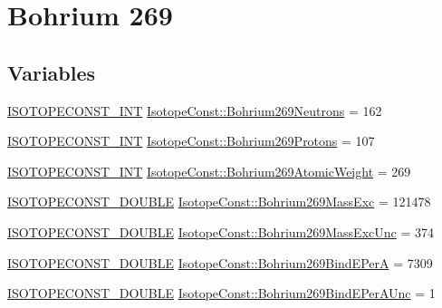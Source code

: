 \hypertarget{group___isotope_const-_bohrium-_bh269}{}\section{Bohrium 269}
\label{group___isotope_const-_bohrium-_bh269}
\subsection*{Variables}
\begin{DoxyCompactItemize}
\item 
\mbox{\hyperlink{group___isotope_const-_macros_ga5f18360b3e99483a35c32d789e62621c}{I\+S\+O\+T\+O\+P\+E\+C\+O\+N\+S\+T\+\_\+\+I\+NT}} \mbox{\hyperlink{group___isotope_const-_bohrium-_bh269_ga666e989583d4fa709b67b014e99767fc}{Isotope\+Const\+::\+Bohrium269\+Neutrons}} = 162
\item 
\mbox{\hyperlink{group___isotope_const-_macros_ga5f18360b3e99483a35c32d789e62621c}{I\+S\+O\+T\+O\+P\+E\+C\+O\+N\+S\+T\+\_\+\+I\+NT}} \mbox{\hyperlink{group___isotope_const-_bohrium-_bh269_ga0a7a2a96b3a26e07556b8cd0b2fb0b21}{Isotope\+Const\+::\+Bohrium269\+Protons}} = 107
\item 
\mbox{\hyperlink{group___isotope_const-_macros_ga5f18360b3e99483a35c32d789e62621c}{I\+S\+O\+T\+O\+P\+E\+C\+O\+N\+S\+T\+\_\+\+I\+NT}} \mbox{\hyperlink{group___isotope_const-_bohrium-_bh269_ga1162d67307e69774a4e907ad2013d976}{Isotope\+Const\+::\+Bohrium269\+Atomic\+Weight}} = 269
\item 
\mbox{\hyperlink{group___isotope_const-_macros_ga8f45a7272ce02c0b4c65c44636ed719a}{I\+S\+O\+T\+O\+P\+E\+C\+O\+N\+S\+T\+\_\+\+D\+O\+U\+B\+LE}} \mbox{\hyperlink{group___isotope_const-_bohrium-_bh269_gafaaddeae53b7618cd35c43cfd8cd35b8}{Isotope\+Const\+::\+Bohrium269\+Mass\+Exc}} = 121478
\item 
\mbox{\hyperlink{group___isotope_const-_macros_ga8f45a7272ce02c0b4c65c44636ed719a}{I\+S\+O\+T\+O\+P\+E\+C\+O\+N\+S\+T\+\_\+\+D\+O\+U\+B\+LE}} \mbox{\hyperlink{group___isotope_const-_bohrium-_bh269_gad9aead8be3d458910974cdb4e87e9f2b}{Isotope\+Const\+::\+Bohrium269\+Mass\+Exc\+Unc}} = 374
\item 
\mbox{\hyperlink{group___isotope_const-_macros_ga8f45a7272ce02c0b4c65c44636ed719a}{I\+S\+O\+T\+O\+P\+E\+C\+O\+N\+S\+T\+\_\+\+D\+O\+U\+B\+LE}} \mbox{\hyperlink{group___isotope_const-_bohrium-_bh269_ga4ce1e0ac6270247c06725ec72ceb8c98}{Isotope\+Const\+::\+Bohrium269\+Bind\+E\+PerA}} = 7309
\item 
\mbox{\hyperlink{group___isotope_const-_macros_ga8f45a7272ce02c0b4c65c44636ed719a}{I\+S\+O\+T\+O\+P\+E\+C\+O\+N\+S\+T\+\_\+\+D\+O\+U\+B\+LE}} \mbox{\hyperlink{group___isotope_const-_bohrium-_bh269_gae211a6081e3280db8fd2e42bd6f1b24d}{Isotope\+Const\+::\+Bohrium269\+Bind\+E\+Per\+A\+Unc}} = 1

\end{DoxyCompactItemize}
